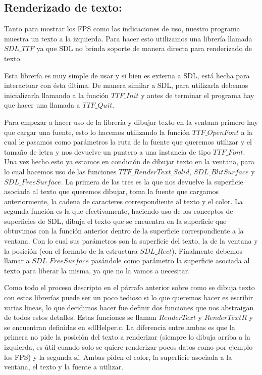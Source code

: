 \documentclass[a4paper]{article}
\newcounter{col}
\begin{document}
\subsection{Renderizado de texto:}
Tanto para mostrar los FPS como las indicaciones de uso, nuestro programa muestra un texto a la izquierda. Para hacer esto utilizamos una librería llamada $SDL\_TTF$ ya que SDL no brinda soporte de manera directa para renderizado de texto.
\par Esta librería es muy simple de usar y si bien es externa a SDL, está hecha para interactuar con ésta última. De manera similar a SDL, para utilizarla debemos inicializarla llamando a la función $TTF\_Init$ y antes de terminar el programa hay que hacer una llamada a $TTF\_Quit$.
\par Para empezar a hacer uso de la librería y dibujar texto en la ventana primero hay que cargar una fuente, esto lo hacemos utilizando la función $TTF\_OpenFont$ a la cual le pasamos como parámetros la ruta de la fuente que queremos utilizar y el tamaño de letra y nos devuelve un puntero a una instancia de tipo $TTF\_Font$. Una vez hecho esto ya estamos en condición de dibujar texto en la ventana, para lo cual hacemos uso de las funciones $TTF\_RenderText\_Solid$, $SDL\_BlitSurface$ y $SDL\_FreeSurface$. La primera de las tres es la que nos devuelve la superficie asociada al texto que queremos dibujar, toma la fuente que cargamos anteriormente, la cadena de caracteres correspondiente al texto y el color. La segunda función es la que efectivamente, haciendo uso de los conceptos de superficies de SDL, dibuja el texto que se encuentra en la superficie que obtuvimos con la función anterior dentro de la superficie correspondiente a la ventana. Con lo cual sus parámetros son la superficie del texto, la de la ventana y la posición (con el formato de la estructura $SDL\_Rect$). Finalmente debemos llamar a $SDL\_FreeSurface$ pasándole como parámetro la superficie asociada al texto para liberar la misma, ya que no la vamos a necesitar.
\par Como todo el proceso descripto en el párrafo anterior sobre como se dibuja texto con estas librerías puede ser un poco tedioso si lo que queremos hacer es escribir varias lineas, lo que decidimos hacer fue definir dos funciones que nos abstraigan de todos estos detalles. Estas funciones se llaman $RenderText$ y $RenderTextR$ y se encuentran definidas en sdlHelper.c. La diferencia entre ambas es que la primera no pide la posición del texto a renderizar (siempre lo dibuja arriba a la izquierda, es útil cuando solo se quiere renderizar pocos datos como por ejemplo los FPS) y la segunda sí. Ambas piden el color, la superficie asociada a la ventana, el texto y la fuente a utilizar.
\end{document}
